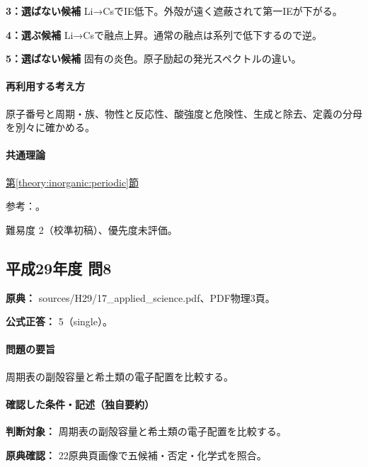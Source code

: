 \noindent\textbf{3：選ばない候補} Li→CsでIE低下。外殻が遠く遮蔽されて第一IEが下がる。\par

\noindent\textbf{4：選ぶ候補} Li→Csで融点上昇。通常の融点は系列で低下するので逆。\par

\noindent\textbf{5：選ばない候補} 固有の炎色。原子励起の発光スペクトルの違い。\par

\paragraph{再利用する考え方} 原子番号と周期・族、物性と反応性、酸強度と危険性、生成と除去、定義の分母を別々に確かめる。

\paragraph{共通理論} \hyperref[theory:inorganic:periodic]{第\ref*{theory:inorganic:periodic}節}

\par 参考：\cite{inorganic_alkali,atomic_nist2019}。

\par 難易度 2（校準初稿）、優先度未評価。

\subsection{平成29年度 問8}
\label{q:h29-reg-applied-08}

\noindent\textbf{原典：} sources/H29/17\_applied\_science.pdf、PDF物理3頁。

\textbf{公式正答：} 5（single）。

\paragraph{問題の要旨} 周期表の副殻容量と希土類の電子配置を比較する。

\paragraph{確認した条件・記述（独自要約）}\mbox{}\par

\noindent\textbf{判断対象：} 周期表の副殻容量と希土類の電子配置を比較する。\par

\noindent\textbf{原典確認：} 22原典頁画像で五候補・否定・化学式を照合。\par

